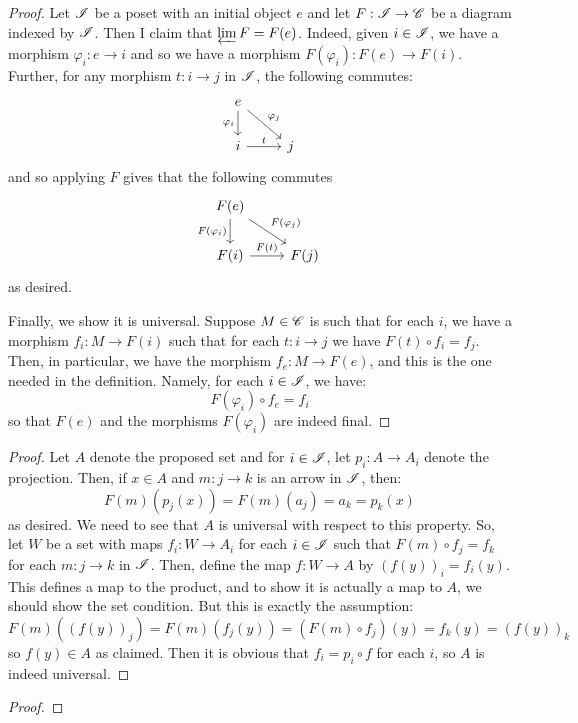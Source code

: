 \documentclass[12pt]{exam}
\begin{document}
\begin{proof}
	Let $\mathscr{I}$ be a poset with an initial object $e$ and let $F : \mathscr{I} \to \mathscr{C}$ be a diagram indexed by $\mathscr{I}$. Then I claim that $\varprojlim F = F(e)$. Indeed, given $i \in \mathscr{I}$, we have a morphism $\varphi_i : e \to i$ and so we have a morphism $F(\varphi_i) : F(e) \to F(i)$. Further, for any morphism $t : i \to j$ in $\mathscr{I}$, the following commutes:
	\[ \begin{tikzcd} e \arrow[swap]{d}{\varphi_i} \arrow{dr}{\varphi_j} \\ i \arrow{r}{t} & j \end{tikzcd} \]
	and so applying $F$ gives that the following commutes
	\[ \begin{tikzcd} F(e) \arrow[swap]{d}{F(\varphi_i)} \arrow{dr}{F(\varphi_j)} \\ F(i) \arrow{r}{F(t)} & F(j) \end{tikzcd} \]
	as desired.
	
	Finally, we show it is universal. Suppose $M \in \mathscr{C}$ is such that for each $i$, we have a morphism $f_i : M \to F(i)$ such that for each $t : i \to j$ we have $F(t) \circ f_i = f_j$. Then, in particular, we have the morphism $f_e : M \to F(e)$, and this is the one needed in the definition. Namely, for each $i \in \mathscr{I}$, we have:
	\[ F(\varphi_i) \circ f_e = f_i \]
	so that $F(e)$ and the morphisms $F(\varphi_i)$ are indeed final.
\end{proof}

\begin{proof}
	Let $A$ denote the proposed set and for $i \in \mathscr{I}$, let $p_i : A \to A_i$ denote the projection. Then, if $x \in A$ and $m : j \to k$ is an arrow in $\mathscr{I}$, then:
	\[ F(m)(p_j(x)) = F(m)(a_j) = a_k = p_k(x) \]
	as desired. We need to see that $A$ is universal with respect to this property. So, let $W$ be a set with maps $f_i : W \to A_i$ for each $i \in \mathscr{I}$ such that $F(m) \circ f_j = f_k$ for each $m : j \to k$ in $\mathscr{I}$. Then, define the map $f : W \to A$ by $(f(y))_i = f_i(y)$. This defines a map to the product, and to show it is actually a map to $A$, we should show the set condition. But this is exactly the assumption:
	\[ F(m)((f(y))_j) = F(m)(f_j(y)) = (F(m) \circ f_j)(y) = f_k(y) = (f(y))_k \]
	so $f(y) \in A$ as claimed. Then it is obvious that $f_i = p_i \circ f$ for each $i$, so $A$ is indeed universal.
\end{proof}

\begin{proof}
\end{proof}
\end{document}
